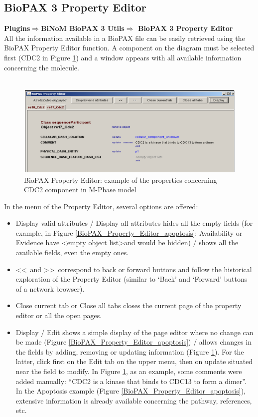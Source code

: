 \subsection{BioPAX 3 Property Editor} \label{BioPAX_Property_Editor}
\textbf{Plugins$\Rightarrow$BiNoM BioPAX 3 Utils$\Rightarrow$ BioPAX 3 Property Editor}\\
All the information available in a BioPAX file can be easily retrieved using the BioPAX Property Editor function. A component on the diagram must be selected first (CDC2 in Figure \ref{BioPAX_Property_Editor_cdc2}) and a window appears with all available information concerning the molecule.\\\\
\begin{figure}[h]
\centering
\includegraphics[width=18 cm]{graphics/BioPAX_Property_Editor_cdc2}
\caption{BioPAX Property Editor: example of the properties concerning CDC2 component in M-Phase model}
\label{BioPAX_Property_Editor_cdc2}
\end{figure}
\parbox{\textwidth}{ In the menu of the Property Editor, several options are offered:
\begin{itemize}
\item Display valid attributes / Display all attributes hides all the empty fields (for example, in Figure \ref{BioPAX_Property_Editor_apoptosis}: Availability or Evidence have \textless empty object list\textgreater and would be hidden) / shows all the available fields, even the empty ones.
\item  \textless\textless~and \textgreater\textgreater~correspond to back or forward buttons and follow the historical exploration of the Property Editor (similar to ‘Back’ and ‘Forward’ buttons of a network browser).
\item Close current tab or Close all tabs closes the current page of the property editor or all the open pages.
\item  Display / Edit shows a simple display of the page editor where no change can be made (Figure \ref{BioPAX_Property_Editor_apoptosis}) / allows changes in the fields by adding, removing or updating information (Figure \ref{BioPAX_Property_Editor_cdc2}). For the latter, click first on the Edit tab on the upper menu, then on update situated near the field to modify. In Figure \ref{BioPAX_Property_Editor_cdc2}, as an example, some comments were added manually: “CDC2 is a kinase that binds to CDC13 to form a dimer”. In the Apoptosis example (Figure \ref{BioPAX_Property_Editor_apoptosis}), extensive information is already available concerning the pathway, references, etc.
\end{itemize}}
